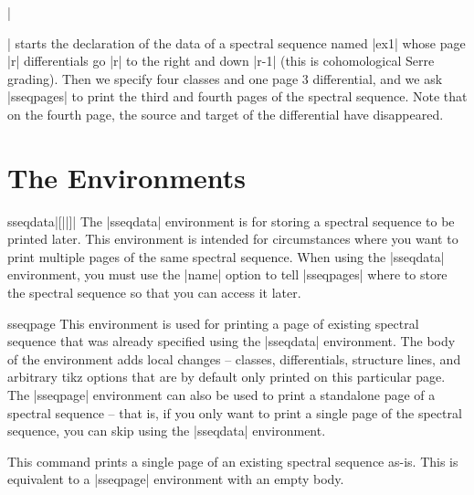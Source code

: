 \documentclass{ltxdoc}
\begin{document}
|\begin{sseqdata}[name=ex1,degree={#1}{1-#1}]| starts the declaration of the data of a spectral sequence named |ex1| whose page |r| differentials go |r| to the right and down |r-1| (this is cohomological Serre grading). Then we specify four classes and one page 3 differential, and we ask |sseqpages| to print the third and fourth pages of the spectral sequence. Note that on the fourth page, the source and target of the differential have disappeared.

\section{The Environments}
\begin{environment}{{sseqdata}|[||]|}
The |sseqdata| environment is for storing a spectral sequence to be printed later. This environment is intended for circumstances where you want to print multiple pages of the same spectral sequence. When using the |sseqdata| environment, you must use the |name| option to tell |sseqpages| where to store the spectral sequence so that you can access it later.
\end{environment}

\begin{environment}{{sseqpage}}
This environment is used for printing a page of existing spectral sequence that was already specified using the |sseqdata| environment. The body of the environment adds local changes -- classes, differentials, structure lines, and arbitrary tikz options that are by default only printed on this particular page. The |sseqpage| environment can also be used to print a standalone page of a spectral sequence -- that is, if you only want to print a single page of the spectral sequence, you can skip using the |sseqdata| environment.
\end{environment}

\begin{command}{}
This command prints a single page of an existing spectral sequence as-is. This is equivalent to a |sseqpage| environment with an empty body.
\end{command}



\end{sseqdata}
\end{document}
